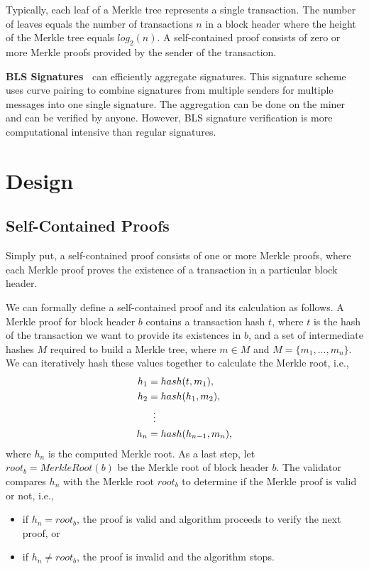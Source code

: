 \documentclass[conference]{IEEEtran}
\begin{document}
Typically, each leaf of a Merkle tree represents a single transaction. The number of leaves equals the number of transactions $n$ in a block header where the height of the Merkle tree equals $log_2(n)$. A self-contained proof consists of zero or more Merkle proofs provided by the sender of the transaction.

\textbf{BLS Signatures~\cite{BLS}} can efficiently aggregate signatures. This signature scheme uses curve pairing to combine signatures from multiple senders for multiple messages into one single signature. The aggregation can be done on the miner and can be verified by anyone. However, BLS signature verification is more computational intensive than regular signatures.

\section{Design}

\subsection{Self-Contained Proofs}

Simply put, a self-contained proof consists of one or more Merkle proofs, where each Merkle proof proves the existence of a transaction in a particular block header.

We can formally define a self-contained proof and its calculation as follows. A Merkle proof for block header $b$ contains a transaction hash $t$, where $t$ is the hash of the transaction we want to provide its existences in $b$, and a set of intermediate hashes $M$ required to build a Merkle tree, where $m \in M$ and $M = \{m_1, ..., m_n\}$. We can iteratively hash these values together to calculate the Merkle root, i.e.,
\begin{align*}
  h_1 &= hash(t, m_1),\\
  h_2 &= hash(h_1, m_2),\\ 
  &\;\;\vdots \notag \\
  h_n &= hash(h_{n-1}, m_n),
\end{align*}
where $h_n$ is the computed Merkle root. As a last step, let $root_b = MerkleRoot(b)$ be the Merkle root of block header $b$. The validator compares $h_n$ with the Merkle root $root_b$ to determine if the Merkle proof is valid or not, i.e., 
\begin{itemize}
	\item if $h_n = root_b$, the proof is valid and algorithm proceeds to verify the next proof, or
	\item if $h_n \neq root_b$, the proof is invalid and the algorithm stops.
\end{itemize}
\end{document}
